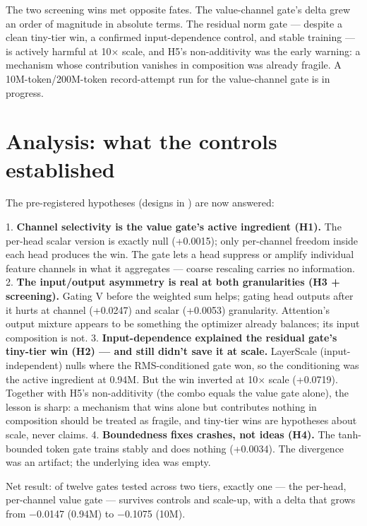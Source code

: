 \documentclass[11pt,a4paper]{article}
\begin{document}
The two screening wins met opposite fates. The value-channel gate's delta grew an order of magnitude in absolute terms. The residual norm gate --- despite a clean tiny-tier win, a confirmed input-dependence control, and stable training --- is actively harmful at 10$\times$ scale, and H5's non-additivity was the early warning: a mechanism whose contribution vanishes in composition was already fragile. A 10M-token/200M-token record-attempt run for the value-channel gate is in progress.

\section{Analysis: what the controls established}

The pre-registered hypotheses (designs in \texttt{}) are now answered:

1. \textbf{Channel selectivity is the value gate's active ingredient (H1).} The per-head scalar version is exactly null (+0.0015); only per-channel freedom inside each head produces the win. The gate lets a head suppress or amplify individual feature channels in what it aggregates --- coarse rescaling carries no information. 2. \textbf{The input/output asymmetry is real at both granularities (H3 + screening).} Gating V before the weighted sum helps; gating head outputs after it hurts at channel (+0.0247) and scalar (+0.0053) granularity. Attention's output mixture appears to be something the optimizer already balances; its input composition is not. 3. \textbf{Input-dependence explained the residual gate's tiny-tier win (H2) --- and still didn't save it at scale.} LayerScale (input-independent) nulls where the RMS-conditioned gate won, so the conditioning was the active ingredient at 0.94M. But the win inverted at 10$\times$ scale (+0.0719). Together with H5's non-additivity (the combo equals the value gate alone), the lesson is sharp: a mechanism that wins alone but contributes nothing in composition should be treated as fragile, and tiny-tier wins are hypotheses about scale, never claims. 4. \textbf{Boundedness fixes crashes, not ideas (H4).} The tanh-bounded token gate trains stably and does nothing (+0.0034). The divergence was an artifact; the underlying idea was empty.

Net result: of twelve gates tested across two tiers, exactly one --- the per-head, per-channel value gate --- survives controls and scale-up, with a delta that grows from $-$0.0147 (0.94M) to $-$0.1075 (10M).
\end{document}
